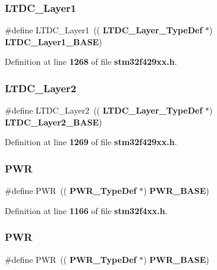 \subsubsection{L\+T\+D\+C\+\_\+\+Layer1}
{\footnotesize\ttfamily \#define L\+T\+D\+C\+\_\+\+Layer1~((\textbf{ L\+T\+D\+C\+\_\+\+Layer\+\_\+\+Type\+Def} $\ast$)\textbf{ L\+T\+D\+C\+\_\+\+Layer1\+\_\+\+B\+A\+SE})}



Definition at line \textbf{ 1268} of file \textbf{ stm32f429xx.\+h}.

\mbox{\label{group__Peripheral__declaration_gada57137d7b85a1223b5bf289e158e363}} 
\subsubsection{L\+T\+D\+C\+\_\+\+Layer2}
{\footnotesize\ttfamily \#define L\+T\+D\+C\+\_\+\+Layer2~((\textbf{ L\+T\+D\+C\+\_\+\+Layer\+\_\+\+Type\+Def} $\ast$)\textbf{ L\+T\+D\+C\+\_\+\+Layer2\+\_\+\+B\+A\+SE})}



Definition at line \textbf{ 1269} of file \textbf{ stm32f429xx.\+h}.

\mbox{\label{group__Peripheral__declaration_ga04651c526497822a859942b928e57f8e}} 
\subsubsection{P\+WR\hspace{0.1cm}{\footnotesize\ttfamily [1/2]}}
{\footnotesize\ttfamily \#define P\+WR~((\textbf{ P\+W\+R\+\_\+\+Type\+Def} $\ast$) \textbf{ P\+W\+R\+\_\+\+B\+A\+SE})}



Definition at line \textbf{ 1166} of file \textbf{ stm32f4xx.\+h}.

\mbox{\label{group__Peripheral__declaration_ga04651c526497822a859942b928e57f8e}} 
\subsubsection{P\+WR\hspace{0.1cm}{\footnotesize\ttfamily [2/2]}}
{\footnotesize\ttfamily \#define P\+WR~((\textbf{ P\+W\+R\+\_\+\+Type\+Def} $\ast$) \textbf{ P\+W\+R\+\_\+\+B\+A\+SE})}



